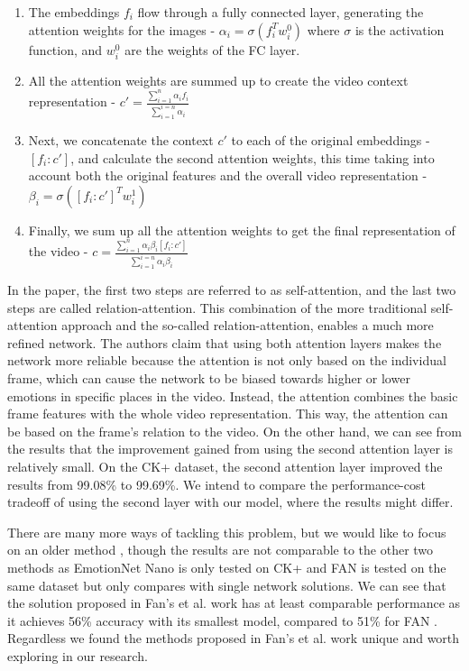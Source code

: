 \documentclass[../main.tex]{subfiles}
\begin{document}
 
\begin{enumerate}[i]
    \item The embeddings $f_i$ flow through a fully connected layer, generating the attention weights for the images - $\alpha_i = \sigma(f_i^Tw_i^0)$
        where $\sigma$ is the activation function, and $w_i^0$ are the weights of the FC layer.
    \item All the attention weights are summed up to create the video context representation - $c'=\frac{\sum_{i=1}^{n}\alpha_if_i}{\sum_{i=1}^{i=n}\alpha_i}$
    \item Next, we concatenate the context $c'$ to each of the original embeddings - $[f_i:c']$, and calculate the second attention weights, this time 
        taking into account both the original features and the overall video representation - $\beta_i = \sigma([f_i:c']^Tw_i^1)$
    \item Finally, we sum up all the attention weights to get the final representation of the video - 
    $c = \frac{\sum_{i=1}^{n}\alpha_i\beta_i[f_i:c']}{\sum_{i=1}^{i=n}\alpha_i\beta_i}$
\end{enumerate}
 

In the paper, the first two steps are referred to as self-attention, and the last two steps are called relation-attention.
This combination of the more traditional self-attention approach and the so-called relation-attention, enables a much more refined network.
The authors claim that using both attention layers makes the network more reliable because the attention is not only based on the individual frame,
which can cause the network to be biased towards higher or lower emotions in specific places in the video. Instead, the attention combines the basic frame
features with the whole video representation. This way, the attention can be based on the frame's relation to the video.
On the other hand, we can see from the results that the improvement gained from using the second attention layer is relatively small. On the CK+ dataset,
the second attention layer improved the results from 99.08\% to 99.69\%. We intend to compare the performance-cost tradeoff of
using the second layer with our model, where the results might differ.
\par

There are many more ways of tackling this problem, but we would like to focus on an older method \cite{c3d},
though the results are not comparable to the other two methods as EmotionNet Nano \cite{emotionnet-nano} is only tested on CK+ and FAN \cite{fan}
is tested on the same dataset but only compares with single network solutions. We can see that the solution proposed in Fan's et al. work \cite{c3d}
has at least comparable performance as it achieves 56\% accuracy with its smallest model, compared to 51\% for FAN \cite{fan}.
Regardless we found the methods proposed in Fan's et al. work \cite{c3d} unique and worth exploring in our research.
\par
\end{document}
